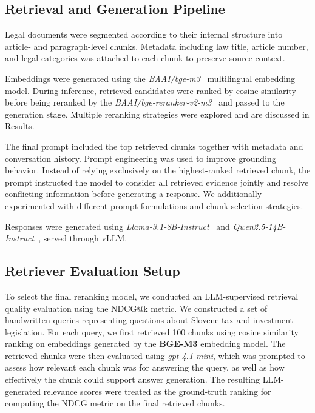 \documentclass[fleqn,moreauthors,10pt]{ds_report}
\begin{document}
\subsection*{Retrieval and Generation Pipeline}

Legal documents were segmented according to their internal structure into article- and paragraph-level chunks. Metadata including law title, article number, and legal categories was attached to each chunk to preserve source context.

Embeddings were generated using the \emph{BAAI/bge-m3}~\cite{bgem3} multilingual embedding model. During inference, retrieved candidates were ranked by cosine similarity before being reranked by the \emph{BAAI/bge-reranker-v2-m3}~\cite{reranker} and passed to the generation stage. Multiple reranking strategies were explored and are discussed in Results.


The final prompt included the top retrieved chunks together with metadata and conversation history. Prompt engineering was used to improve grounding behavior. Instead of relying exclusively on the highest-ranked retrieved chunk, the prompt instructed the model to consider all retrieved evidence jointly and resolve conflicting information before generating a response. We additionally experimented with different prompt formulations and chunk-selection strategies.

Responses were generated using \emph{Llama-3.1-8B-Instruct}~\cite{llmllama} and \emph{Qwen2.5-14B-Instruct}~\cite{qwen}, served through vLLM.


\subsection*{Retriever Evaluation Setup}

To select the final reranking model, we conducted an LLM-supervised retrieval quality evaluation using the NDCG@k metric. We constructed a set of handwritten queries representing questions about Slovene tax and investment legislation. For each query, we first retrieved 100 chunks using cosine similarity ranking on embeddings generated by the \textbf{BGE-M3} embedding model. The retrieved chunks were then evaluated using \textit{gpt-4.1-mini}, which was prompted to assess how relevant each chunk was for answering the query, as well as how effectively the chunk could support answer generation. The resulting LLM-generated relevance scores were treated as the ground-truth ranking for computing the NDCG metric on the final retrieved chunks.
\end{document}
